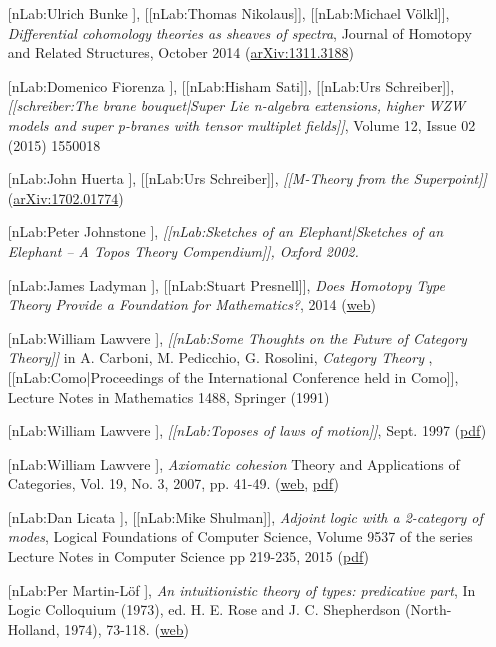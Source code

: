 \documentclass[12pt,titlepage]{article}
\theoremstyle{plain}
\theoremstyle{definition}
\theoremstyle{remark}
\begin{document}
\begin{itemize}%
\item [[nLab:Ulrich Bunke]], [[nLab:Thomas Nikolaus]], [[nLab:Michael Völkl]], \emph{Differential cohomology theories as sheaves of spectra}, Journal of Homotopy and Related Structures, October 2014 (\href{http://arxiv.org/abs/1311.3188}{arXiv:1311.3188})
\item [[nLab:Domenico Fiorenza]], [[nLab:Hisham Sati]], [[nLab:Urs Schreiber]], \emph{[[schreiber:The brane bouquet|Super Lie n-algebra extensions, higher WZW models and super p-branes with tensor multiplet fields]]}, Volume 12, Issue 02 (2015) 1550018
\item [[nLab:John Huerta]], [[nLab:Urs Schreiber]], \emph{[[M-Theory from the Superpoint]]} (\href{https://arxiv.org/abs/1702.01774}{arXiv:1702.01774})
\item [[nLab:Peter Johnstone]], \emph{[[nLab:Sketches of an Elephant|Sketches of an Elephant -- A Topos Theory Compendium]], Oxford 2002.}
\item [[nLab:James Ladyman]], [[nLab:Stuart Presnell]], \emph{Does Homotopy Type Theory Provide a Foundation for Mathematics?}, 2014 (\href{http://philsci-archive.pitt.edu/11143/}{web})
\item [[nLab:William Lawvere]], \emph{[[nLab:Some Thoughts on the Future of Category Theory]]} in A. Carboni, M. Pedicchio, G. Rosolini, \emph{Category Theory} , [[nLab:Como|Proceedings of the International Conference held in Como]], Lecture Notes in Mathematics 1488, Springer (1991)
\item [[nLab:William Lawvere]], \emph{[[nLab:Toposes of laws of motion]]}, Sept. 1997 (\href{http://www.acsu.buffalo.edu/~wlawvere/ToposMotion.pdf}{pdf})
\item [[nLab:William Lawvere]], \emph{Axiomatic cohesion} Theory and Applications of Categories, Vol. 19, No. 3, 2007, pp. 41-49. (\href{http://www.tac.mta.ca/tac/volumes/19/3/19-03abs.html}{web}, \href{http://www.tac.mta.ca/tac/volumes/19/3/19-03.pdf}{pdf})
\item [[nLab:Dan Licata]], [[nLab:Mike Shulman]], \emph{Adjoint logic with a 2-category of modes}, Logical Foundations of Computer Science, Volume 9537 of the series Lecture Notes in Computer Science pp 219-235, 2015 (\href{http://dlicata.web.wesleyan.edu/pubs/ls15adjoint/ls15adjoint.pdf}{pdf})
\item [[nLab:Per Martin-Löf]], \emph{An intuitionistic theory of types: predicative part}, In Logic Colloquium (1973), ed. H. E. Rose and J. C. Shepherdson (North-Holland, 1974), 73-118. (\href{http://citeseerx.ist.psu.edu/viewdoc/summary?doi=10.1.1.131.926}{web})

\end{itemize}
\end{document}
